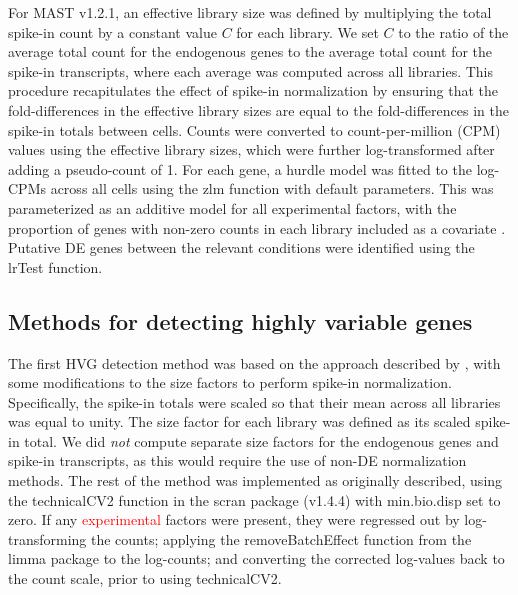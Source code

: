 \documentclass{article}
\newcommand\revised[1]{\textcolor{red}{#1}}
\begin{document}
For MAST v1.2.1, an effective library size was defined by multiplying the total spike-in count by a constant value $C$ for each library.
We set $C$ to the ratio of the average total count for the endogenous genes to the average total count for the spike-in transcripts, where each average was computed across all libraries.
This procedure recapitulates the effect of spike-in normalization by ensuring that the fold-differences in the effective library sizes are equal to the fold-differences in the spike-in totals between cells.
Counts were converted to count-per-million (CPM) values using the effective library sizes, which were further log-transformed after adding a pseudo-count of 1.
For each gene, a hurdle model was fitted to the log-CPMs across all cells using the zlm function with default parameters.
This was parameterized as an additive model for all experimental factors, with the proportion of genes with non-zero counts in each library included as a covariate \citep{finak2015mast}.
Putative DE genes between the relevant conditions were identified using the lrTest function.

\subsection{Methods for detecting highly variable genes}
The first HVG detection method was based on the approach described by \citet{brennecke2013accounting}, with some modifications to the size factors to perform spike-in normalization.
Specifically, the spike-in totals were scaled so that their mean across all libraries was equal to unity.
The size factor for each library was defined as its scaled spike-in total.
We did \textit{not} compute separate size factors for the endogenous genes and spike-in transcripts, as this would require the use of non-DE normalization methods.
The rest of the method was implemented as originally described, using the technicalCV2 function in the scran package (v1.4.4) with min.bio.disp set to zero.
If any \revised{experimental} factors were present, they were regressed out by log-transforming the counts; applying the removeBatchEffect function from the limma package \citep{ritchie2015limma} to the log-counts; and converting the corrected log-values back to the count scale, prior to using technicalCV2.
\end{document}
